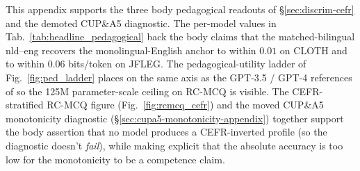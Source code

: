  This appendix supports the three body pedagogical readouts of \S\ref{sec:discrim-cefr} and the demoted CUP\&A5 diagnostic. The per-model values in Tab.~\ref{tab:headline_pedagogical} back the body claims that the matched-bilingual nld--eng \beetle{} recovers the monolingual-English anchor to within $0.01$ on CLOTH and to within $0.06$ bits/token on JFLEG. The pedagogical-utility ladder of Fig.~\ref{fig:ped_ladder} places \beetle{} on the same axis as the GPT-3.5 / GPT-4 references of \citet{benedetto-etal-2024-using} so the 125M parameter-scale ceiling on RC-MCQ is visible. The CEFR-stratified RC-MCQ figure (Fig.~\ref{fig:rcmcq_cefr}) and the moved CUP\&A5 monotonicity diagnostic (\S\ref{sec:cupa5-monotonicity-appendix}) together support the body assertion that no \beetle{} model produces a CEFR-inverted profile (so the diagnostic doesn't \emph{fail}), while making explicit that the absolute accuracy is too low for the monotonicity to be a competence claim.

